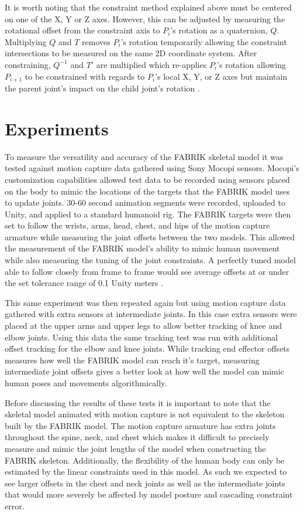 \documentclass[10pt,twocolumn]{article}
\begin{document}
 It is worth noting that the constraint method explained above must be centered on one of the X, Y or Z axes. However, this can be adjusted by measuring the rotational offset from the constraint axis to $P_i$'s rotation as a quaternion, $Q$. Multiplying $Q$ and $T$ removes $P_i$'s rotation temporarily allowing the constraint intersections to be measured on the same 2D coordinate system. After constraining,  $Q^{-1}$ and $T'$ are multiplied which re-applies $P_i$'s rotation allowing $P_{i+1}$ to be constrained with regards to $P_i$'s local X, Y, or Z axes but maintain the parent joint's impact on the child joint's rotation \cite{swingTwist}\cite{Quaternions}.

 \section{Experiments}

 To measure the versatility and accuracy of the FABRIK skeletal model it was tested against motion capture data gathered using Sony Mocopi sensors. Mocopi's customization capabilities allowed test data to be recorded using sensors placed on the body to mimic the locations of the targets that the FABRIK model uses to update joints. 30-60 second animation segments were recorded, uploaded to Unity, and applied to a standard humanoid rig. The FABRIK targets were then set to follow the wrists, arms, head, chest, and hips of the motion capture armature while measuring the joint offsets between the two models. This allowed the measurement of the FABRIK model's ability to mimic human movement while also measuring the tuning of the joint constraints. A perfectly tuned model able to follow closely from frame to frame would see average offsets at or under the set tolerance range of 0.1 Unity meters \cite{FABRIKMocap}\cite{benchmarkGit}. 

 This same experiment was then repeated again but using motion capture data gathered with extra sensors at intermediate joints. In this case extra sensors were placed at the upper arms and upper legs to allow better tracking of knee and elbow joints. Using this data the same tracking test was run with additional offset tracking for the elbow and knee joints. While tracking end effector offsets measures how well the FABRIK model can reach it's target, measuring intermediate joint offsets gives a better look at how well the model can mimic human poses and movements algorithmically. 

 Before discussing the results of these tests it is important to note that the skeletal model animated with motion capture is not equivalent to the skeleton built by the FABRIK model. The motion capture armature has extra joints throughout the spine, neck, and chest which makes it difficult to precisely measure and mimic the joint lengths of the model when constructing the FABRIK skeleton. Additionally, the flexibility of the human body can only be estimated by the linear constraints used in this model. As such we expected to see larger offsets in the chest and neck joints as well as the intermediate joints that would more severely be affected by model posture and cascading constraint error.
\end{document}
